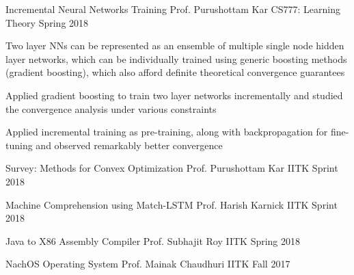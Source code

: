 \cventry
	{Incremental Neural Networks Training}
	{Prof. Purushottam Kar}
	{CS777: Learning Theory}
	{Spring 2018}
	{
		\begin{cvitems}
			\item Two layer NNs can be represented as an ensemble of multiple single node hidden layer networks, which can be individually trained using generic boosting methods (gradient boosting), which also afford definite theoretical convergence guarantees
			\item Applied gradient boosting to train two layer networks incrementally and studied the convergence analysis under various constraints
			\item Applied incremental training as pre-training, along with backpropagation for fine-tuning and observed remarkably better convergence
		\end{cvitems}
	}

\cventry
	{Survey: Methods for Convex Optimization}
	{Prof. Purushottam Kar}
	{IITK}
	{Sprint 2018}
	{}
	
\cventry
	{Machine Comprehension using Match-LSTM}
	{Prof. Harish Karnick}
	{IITK}
	{Sprint 2018}
	{}

\cventry
	{Java to X86 Assembly Compiler}
	{Prof. Subhajit Roy}
	{IITK}
	{Spring 2018}
	{}

\cventry
	{NachOS Operating System}
	{Prof. Mainak Chaudhuri}
	{IITK}
	{Fall 2017}
	{}

